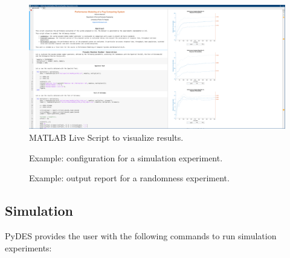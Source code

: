 \begin{figure}
	\includegraphics[width=\columnwidth]{fig/usage-matlab-live-script}
	\caption{MATLAB Live Script to visualize results.}
	\label{fig:usage-matlab-live-script}
\end{figure}

\begin{figure}
	\centering
	
	\caption{Example: configuration for a simulation experiment.}
	\label{fig:usage-simulation-configuration}
\end{figure}

\begin{figure}
	\centering
	
	\caption{Example: output report for a randomness experiment.}
	\label{fig:usage-randomness-kolmogorov-smirnov}
\end{figure}

\subsection{Simulation}
PyDES provides the user with the following commands to run simulation experiments:

